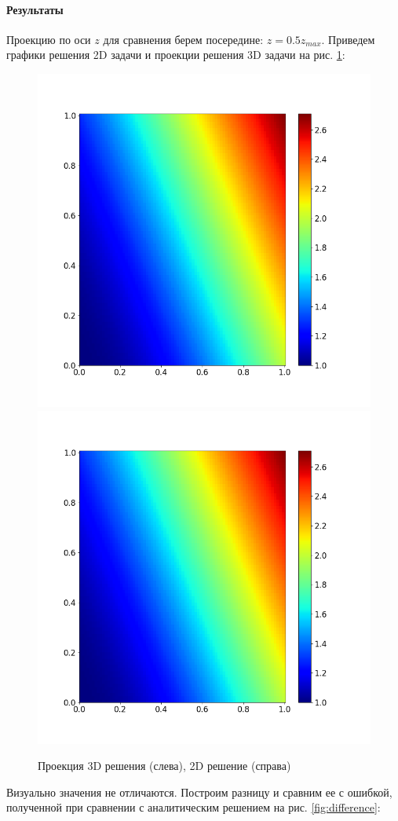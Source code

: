 \paragraph{Результаты} Проекцию по оси $z$ для сравнения берем посередине: $z = 0.5z_{max}$. 
Приведем графики решения 2D задачи и проекции решения 3D задачи на рис. \ref{fig:compare_2d_3d_fields}:
\begin{figure}[H]
\centering
\includegraphics[width=.5\textwidth]{compare_2d_3d/field3d_80.png}\hfill
\includegraphics[width=.5\textwidth]{compare_2d_3d/field3d_80.png}
\caption{Проекция 3D решения (слева), 2D решение (справа)}
\label{fig:compare_2d_3d_fields}
\end{figure}
Визуально значения не отличаются. Построим разницу и сравним ее с ошибкой, полученной при сравнении с аналитическим решением на рис. \ref{fig:difference}:
